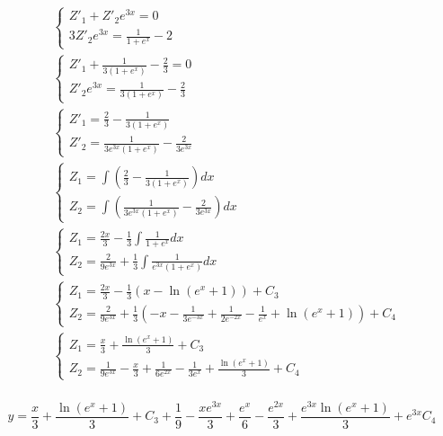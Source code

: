 \begin{align*}
     & \begin{cases}
        Z'_1 + Z'_2 e^{3x} = 0 \\
        3 Z'_2 e^{3x}     = \frac{1}{1 + e^x} - 2
    \end{cases} \\
     & \begin{cases}
        Z'_1 + \frac{1}{3(1 + e^x)} - \frac{2}{3} = 0 \\
        Z'_2 e^{3x} = \frac{1}{3(1 + e^x)} - \frac{2}{3}
    \end{cases} \\
     & \begin{cases}
        Z'_1 = \frac{2}{3} - \frac{1}{3(1 + e^x)} \\
        Z'_2 = \frac{1}{3e^{3x}(1 + e^x)} - \frac{2}{3e^{3x}}
    \end{cases} \\
     & \begin{cases}
        Z_1 = \int \left(\frac{2}{3} - \frac{1}{3(1 + e^x)} \right)dx \\
        Z_2 = \int \left(\frac{1}{3e^{3x}(1 + e^x)} - \frac{2}{3e^{3x}} \right)dx
    \end{cases} \\
     & \begin{cases}
        Z_1 = \frac{2x}{3} - \frac{1}{3} \int \frac{1}{1 + e^x}dx \\
        Z_2 = \frac{2}{9e^{3x}} + \frac{1}{3}\int \frac{1}{e^{3x}(1 + e^x)}dx
    \end{cases} \\
     & \begin{cases}
        Z_1 = \frac{2x}{3} - \frac{1}{3} (x - \ln(e^x + 1)) + C_3 \\
        Z_2 = \frac{2}{9e^{3x}} + \frac{1}{3}\left( - x - \frac{1}{3e^{ - 3x}} + \frac{1}{2e^{ - 2x}} - \frac{1}{e^x} + \ln(e^x + 1)\right) + C_4
    \end{cases} \\
     & \begin{cases}
        Z_1 = \frac{x}{3} + \frac{\ln(e^x + 1)}{3} + C_3 \\
        Z_2 = \frac{1}{9e^{3x}} - \frac{x}{3} + \frac{1}{6e^{2x}} - \frac{1}{3e^x} + \frac{\ln(e^x + 1)}{3} + C_4
    \end{cases} \\
\end{align*}

\[y = \frac{x}{3} + \frac{\ln(e^x + 1)}{3} + C_3 + \frac{1}{9} - \frac{xe^{3x}}{3} + \frac{e^x}{6} - \frac{e^{2x}}{3} + \frac{e^{3x}\ln(e^x + 1)}{3} + e^{3x}C_4\]

